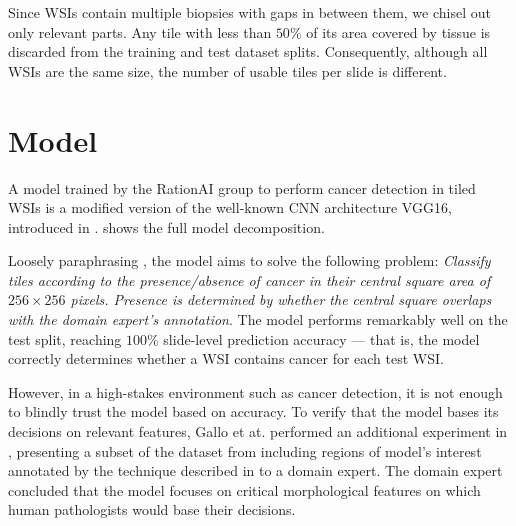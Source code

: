 Since WSIs contain multiple biopsies with gaps in between them, we chisel out only relevant parts.
Any tile with less than $50$\% of its area covered by tissue is discarded from the training and test dataset splits.
Consequently, although all WSIs are the same size, the number of usable tiles per slide is different.

\section{Model}\label{model}

A model trained by the RationAI group to perform cancer detection in tiled WSIs is a modified version of the well-known CNN architecture VGG16, introduced in \cite{vgg16}.
 shows the full model decomposition.

Loosely paraphrasing \cite{gallo}, the model aims to solve the following problem: \emph{Classify tiles according to the presence/absence of cancer in their central square area of $256 \times 256 $ pixels. Presence is determined by whether the central square overlaps with the domain expert's annotation}. The model performs remarkably well on the test split, reaching $100$\% slide-level prediction accuracy --- that is, the model correctly determines whether a WSI contains cancer for each test WSI.

However, in a high-stakes environment such as cancer detection, it is not enough to blindly trust the model based on accuracy.
To verify that the model bases its decisions on relevant features, Gallo et at. performed an additional experiment in \cite{gallo}, presenting a subset of the dataset from  including regions of model's interest annotated by the technique described in  to a domain expert.
The domain expert concluded that the model focuses on critical morphological features \cite{gallo} on which human pathologists would base their decisions.

